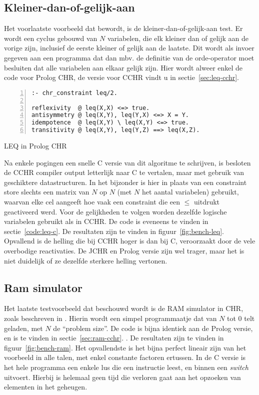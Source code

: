\subsection{Kleiner-dan-of-gelijk-aan} \label{sec:bench-leq}

Het voorlaatste voorbeeld dat bewordt, is de kleiner-dan-of-gelijk-aan test. Er wordt een cyclus gebouwd van $N$ variabelen, die elk kleiner dan of gelijk aan de vorige zijn, inclusief de eerste kleiner of gelijk aan de laatste. Dit wordt als invoer gegeven aan een programma dat dan mbv. de definitie van de orde-operator moet besluiten dat alle variabelen aan elkaar gelijk zijn. Hier wordt alweer enkel de code voor Prolog CHR, de versie voor CCHR vindt u in sectie~\ref{sec:leq-cchr}.
\begin{exCode}
\begin{Verbatim}[frame=single,numbers=left]
:- chr_constraint leq/2.

reflexivity  @ leq(X,X) <=> true.
antisymmetry @ leq(X,Y), leq(Y,X) <=> X = Y.
idempotence  @ leq(X,Y) \ leq(X,Y) <=> true.
transitivity @ leq(X,Y), leq(Y,Z) ==> leq(X,Z).
\end{Verbatim}
\caption{\label{code:tak} LEQ in Prolog CHR}
\end{exCode}
Na enkele pogingen een snelle C versie van dit algoritme te schrijven, is besloten de CCHR compiler output letterlijk naar C te vertalen, maar met gebruik van geschiktere datastructuren. In het bijzonder is hier in plaats van een constraint store slechts een matrix van $N$ op $N$ (met $N$ het aantal variabelen) gebruikt, waarvan elke cel aangeeft hoe vaak een constraint die een $\leq$ uitdrukt geactiveerd werd. Voor de gelijkheden te volgen worden dezelfde logische variabelen gebruikt als in CCHR. De code is eveneens te vinden in sectie~\ref{code:leq-c}.
De resultaten zijn te vinden in figuur~\ref{fig:bench-leq}. Opvallend is de helling die bij CCHR hoger is dan bij C, veroorzaakt door de vele overbodige reactivaties. De JCHR en Prolog versie zijn wel trager, maar het is niet duidelijk of ze dezelfde sterkere helling vertonen.

\subsection{Ram simulator} \label{sec:bench-ram}

Het laatste testvoorbeeld dat beschouwd wordt is de RAM simulator in CHR, zoals beschreven in \cite{jon:complexity:chr05}.
Hierin wordt een simpel programmaatje dat van $N$ tot $0$ telt geladen, met $N$ de ``problem size''. De code is bijna identiek aan de Prolog versie, en is te vinden in sectie~\ref{sec:ram-cchr}. . De resultaten zijn te vinden in figuur~\ref{fig:bench-ram}. Het opvallendste is het bijna perfect lineair zijn van het voorbeeld in alle talen, met enkel constante factoren ertussen. In de C versie is het hele programma een enkele lus die een instructie leest, en binnen een {\em switch} uitvoert. Hierbij is helemaal geen tijd die verloren gaat aan het opzoeken van elementen in het geheugen.

